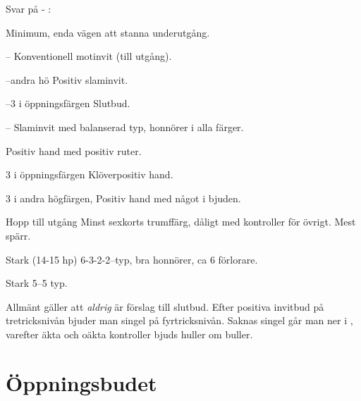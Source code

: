 Svar p{\aa}  - :
\begin{beskriv}
   \item[\kl{3}] Minimum, enda vägen att stanna underutgång.
      \bbe
         \item[--\ru{3}] Konventionell motinvit (till utgång). 
         \item[--andra hö] Positiv slaminvit.
         \item[--3 i öppningsfärgen] Slutbud.
         \item[--\NT{3}] Slaminvit med balanserad typ, honnörer i alla
                        färger.
       \ebe
   \item[\ru{3}] Positiv hand med positiv ruter. 
   \item[3 i \"oppningsf\"argen] Klöverpositiv hand.
   \item[3 i andra h\"ogf\"argen, \la{4}] Positiv hand med något i bjuden.
   \item[Hopp till utg{\aa}ng] Minst sexkorts trumff\"arg, d{\aa}ligt
                               med kontroller f\"or \"ovrigt. Mest spärr.
   \item[\NT{3}] Stark (14-15 hp) 6-3-2-2--typ, bra honnörer, ca
                 6 förlorare.
   \item[\la{4}] Stark 5--5 typ.
\end{beskriv}

Allm\"ant g\"aller att  {\em aldrig} \"ar f\"orslag till slutbud.
Efter positiva invitbud på tretricksnivån bjuder man singel på
fyrtricksnivån. Saknas singel går man ner i , varefter äkta och oäkta
kontroller bjuds huller om buller.

\section{{\"O}ppningsbudet }

